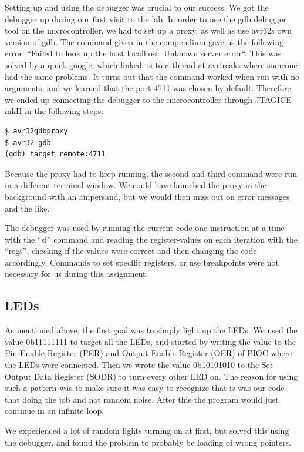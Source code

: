 Setting up and using the debugger was crucial to our success. We got the debugger up during our first visit to the lab. In order to use the gdb debugger tool on the microcontroller, we had to set up a proxy, as well as use avr32s own version of gdb. The command given in the compendium\cite{compendium} gave us the following error: “Failed to look up the host localhost: 
Unknown server error“. This was solved by a quick google, which linked us to a thread at avrfreaks\cite{gdbforum} where someone had the same problems. It turns out that the command worked when run with no arguments, and we learned that the port 4711 was chosen by default. Therefore we ended up connecting the debugger to the microcontroller through JTAGICE mkII in the following steps:\\

\begin{verbatim}
$ avr32gdbproxy
$ avr32-gdb
(gdb) target remote:4711
\end{verbatim}

Because the proxy had to keep running, the second and third command were run in a different terminal window. We could have launched the proxy in the background with an ampersand, but we would then miss out on error messages and the like. 

The debugger was used by running the current code one instruction at a time with the “si” command and reading the register-values on each iteration with the “regs”, checking if the values were correct and then changing the code accordingly. Commands to set specific registers, or use breakpoints were not necessary for us during this assignment.
\subsection{LEDs}

As mentioned above, the first goal was to simply light up the LEDs. We used the value 0b11111111 to target all the LEDs, and started by writing the value to the Pin Enable Register (PER) and Output Enable Register (OER) of PIOC where the LEDs were connected. Then we wrote the value 0b10101010 to the Set Output Data Register (SODR) to turn every other LED on. The reason for using such a pattern was to make sure it was easy to recognize that is was our code that doing the job and not random noise. After this the program would just continue in an infinite loop.

We experienced a lot of random lights turning on at first, but solved this using the debugger, and found the problem to probably be loading of wrong pointers.
